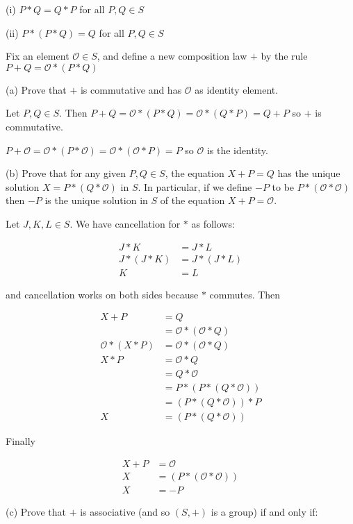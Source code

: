 \documentclass{article}
\begin{document}
(i) $P*Q = Q*P$ for all $P,Q \in S$

(ii) $P*(P*Q) = Q$ for all $P,Q \in S$

Fix an element $\mathcal{O} \in S$, and define a new composition law $+$ by the rule $P+Q = \mathcal{O} * (P * Q)$

(a) Prove that $+$ is commutative and has $\mathcal{O}$ as identity element.

Let $P,Q \in S$. Then $P+Q = \mathcal{O} * (P * Q) = \mathcal{O} * (Q * P) = Q+P$ so $+$ is commutative.

$P + \mathcal{O} = \mathcal{O} * (P * \mathcal{O}) = \mathcal{O} * (\mathcal{O} * P) = P$ so $\mathcal{O}$ is the identity.

(b) Prove that for any given $P,Q \in S$, the equation $X+P = Q$ has the unique solution $X = P*(Q*\mathcal{O})$ in $S$. In particular, if we define $-P$ to be $P*(\mathcal{O} * \mathcal{O})$ then $-P$ is the unique solution in $S$ of the equation $X+P = \mathcal{O}$.

Let $J, K, L \in S$. We have cancellation for $*$ as follows:

\begin{align*}
J * K &= J * L\\
J * (J * K) &= J * (J * L)\\
K &= L
\end{align*}

and cancellation works on both sides because $*$ commutes. Then

\begin{align*}
X+P & = Q \\
& = \mathcal{O} * (\mathcal{O} * Q) \\
\mathcal{O} * (X * P) &= \mathcal{O} * (\mathcal{O} * Q) \\
X * P &= \mathcal{O} * Q \\
&= Q * \mathcal{O} \\
&= P * (P * (Q * \mathcal{O})) \\
&= (P * (Q * \mathcal{O})) * P \\
X &= (P * (Q * \mathcal{O}))
\end{align*}

Finally

\begin{align*}
X+P &= \mathcal{O}\\
X &= (P * (\mathcal{O} * \mathcal{O}))\\
X &= -P
\end{align*}

(c) Prove that $+$ is associative (and so $(S,+)$ is a group) if and only if:
\end{document}
